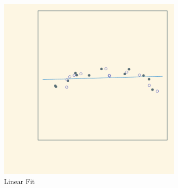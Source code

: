\begin{figure}[t!]
    \centering
    \begin{subfigure}[t]{0.33\textwidth}
        \centering
        \includegraphics[width=\textwidth]{fig/test_linear}
        \caption{Linear Fit \label{fig:poly-linear}}
    \end{subfigure}%
    ~
    \begin{subfigure}[t]{0.33\textwidth}
        \centering

\end{subfigure}
\end{figure}
